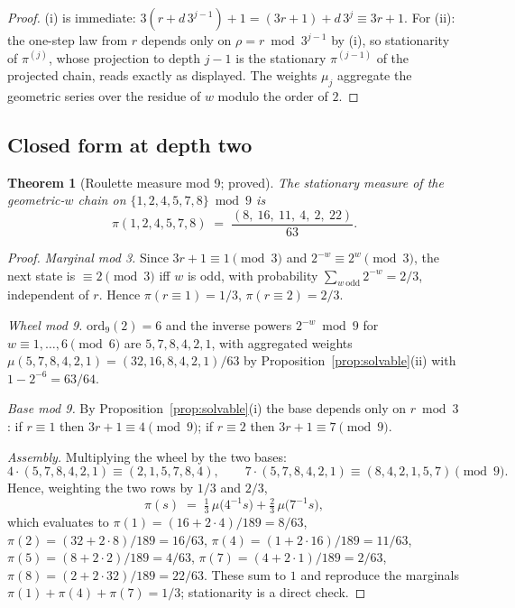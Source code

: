\documentclass[11pt]{article}
\newtheorem{theorem}{Theorem}
\theoremstyle{definition}
\theoremstyle{remark}
\begin{document}
\begin{proof}
(i) is immediate: $3(r + d\,3^{j-1}) + 1 = (3r+1) + d\,3^{j} \equiv 3r+1$.
For (ii): the one-step law from $r$ depends only on $\rho = r \bmod 3^{j-1}$ by
(i), so stationarity of $\pi^{(j)}$, whose projection to depth $j-1$ is the
stationary $\pi^{(j-1)}$ of the projected chain, reads exactly as displayed.
The weights $\mu_j$ aggregate the geometric series over the residue of $w$
modulo the order of $2$.
\end{proof}

\subsection{Closed form at depth two}

\begin{theorem}[Roulette measure mod 9; proved]\label{thm:mod9}
The stationary measure of the geometric-$w$ chain on
$\{1,2,4,5,7,8\} \bmod 9$ is
\[
\pi(1,2,4,5,7,8) \;=\; \frac{(8,\ 16,\ 11,\ 4,\ 2,\ 22)}{63}.
\]
\end{theorem}

\begin{proof}
\emph{Marginal mod 3.} Since $3r + 1 \equiv 1 \pmod 3$ and
$2^{-w} \equiv 2^{w} \pmod 3$, the next state is $\equiv 2 \pmod 3$ iff $w$ is
odd, with probability $\sum_{w \ \mathrm{odd}} 2^{-w} = 2/3$, independent of
$r$. Hence $\pi(r \equiv 1) = 1/3$, $\pi(r \equiv 2) = 2/3$.

\emph{Wheel mod 9.} $\mathrm{ord}_9(2) = 6$ and the inverse powers
$2^{-w} \bmod 9$ for $w \equiv 1, \ldots, 6 \pmod 6$ are
$5, 7, 8, 4, 2, 1$, with aggregated weights
$\mu(5,7,8,4,2,1) = (32, 16, 8, 4, 2, 1)/63$ by
Proposition~\ref{prop:solvable}(ii) with $1 - 2^{-6} = 63/64$.

\emph{Base mod 9.} By Proposition~\ref{prop:solvable}(i) the base depends only
on $r \bmod 3$: if $r \equiv 1$ then $3r + 1 \equiv 4 \pmod 9$; if
$r \equiv 2$ then $3r + 1 \equiv 7 \pmod 9$.

\emph{Assembly.} Multiplying the wheel by the two bases:
\[
4 \cdot (5,7,8,4,2,1) \equiv (2,1,5,7,8,4), \qquad
7 \cdot (5,7,8,4,2,1) \equiv (8,4,2,1,5,7) \pmod 9 .
\]
Hence, weighting the two rows by $1/3$ and $2/3$,
\[
\pi(s) \;=\; \tfrac{1}{3}\, \mu\bigl(4^{-1} s\bigr) + \tfrac{2}{3}\, \mu\bigl(7^{-1} s\bigr),
\]
which evaluates to
$\pi(1) = (16 + 2\cdot 4)/189 = 8/63$,
$\pi(2) = (32 + 2\cdot 8)/189 = 16/63$,
$\pi(4) = (1 + 2\cdot 16)/189 = 11/63$,
$\pi(5) = (8 + 2\cdot 2)/189 = 4/63$,
$\pi(7) = (4 + 2\cdot 1)/189 = 2/63$,
$\pi(8) = (2 + 2\cdot 32)/189 = 22/63$.
These sum to $1$ and reproduce the marginals
$\pi(1) + \pi(4) + \pi(7) = 1/3$; stationarity is a direct check.
\end{proof}
\end{document}
